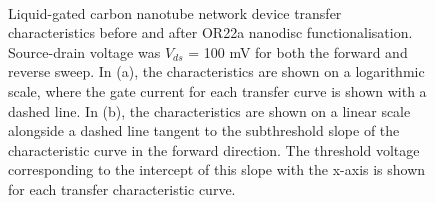 \documentclass[
  a4paper,
]{scrbook}
\begin{document}
\begin{figure}
\begin{minipage}[t]{0.01\linewidth}
\end{minipage}%
%
\begin{minipage}[t]{0.45\linewidth}

{\centering 


}

\end{minipage}%
%
\begin{minipage}[t]{0.01\linewidth}

{\centering 

~

}

\end{minipage}%

\caption{\label{fig-OR22a-TX-comparison}Liquid-gated carbon nanotube
network device transfer characteristics before and after OR22a nanodisc
functionalisation. Source-drain voltage was \(V_{ds}\) = 100 mV for both
the forward and reverse sweep. In (a), the characteristics are shown on
a logarithmic scale, where the gate current for each transfer curve is
shown with a dashed line. In (b), the characteristics are shown on a
linear scale alongside a dashed line tangent to the subthreshold slope
of the characteristic curve in the forward direction. The threshold
voltage corresponding to the intercept of this slope with the x-axis is
shown for each transfer characteristic curve.}

\end{figure}
\end{document}

